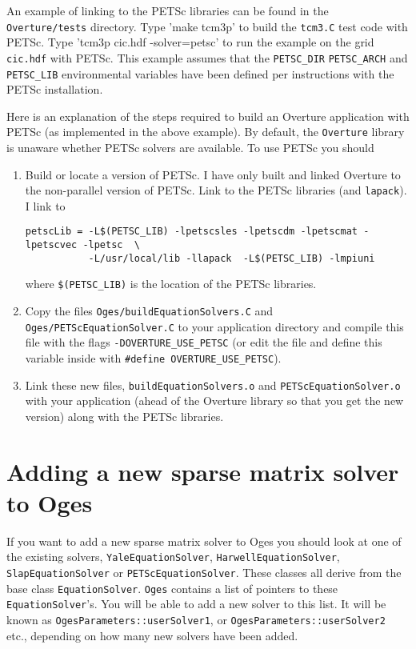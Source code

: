 \documentclass[11pt]{article}
\begin{document}
An example of linking to the PETSc libraries can be found in the {\tt Overture/tests}
directory. Type 'make tcm3p' to build the {\tt tcm3.C} test code with PETSc. Type
'tcm3p cic.hdf -solver=petsc' to run the example on the grid {\tt cic.hdf} with PETSc.
This example assumes that the {\tt PETSC\_DIR} {\tt PETSC\_ARCH} and {\tt PETSC\_LIB} environmental
variables have been defined per instructions with the PETSc installation.

Here is an explanation of the steps required to build an Overture application with PETSc
(as implemented in the above example).
By default, the {\tt Overture} library is unaware whether  PETSc solvers are available. 
To use PETSc you should
\begin{enumerate}
  \item Build or locate a version of PETSc. I have only built and linked Overture to
the non-parallel version of PETSc. Link to the PETSc libraries (and {\tt lapack}). I link to
\begin{verbatim}
petscLib = -L$(PETSC_LIB) -lpetscsles -lpetscdm -lpetscmat -lpetscvec -lpetsc  \
           -L/usr/local/lib -llapack  -L$(PETSC_LIB) -lmpiuni 
\end{verbatim}
where {\tt \$(PETSC\_LIB)} is the location of the PETSc libraries.
  \item Copy the files {\tt Oges/buildEquationSolvers.C} and {\tt Oges/PETScEquationSolver.C}
    to your application directory
    and compile this file with the flags {\tt -DOVERTURE\_USE\_PETSC} (or edit the file and
   define this variable inside with {\tt \#define OVERTURE\_USE\_PETSC}).
  \item Link these new files, {\tt buildEquationSolvers.o} and {\tt PETScEquationSolver.o}
      with your application (ahead of the
     Overture library so that you get the new version) along with the PETSc libraries.
\end{enumerate}

\section{Adding a new sparse matrix solver to Oges}

If you want to add a new sparse matrix solver to Oges you should look at one of the
existing solvers, {\tt YaleEquationSolver}, {\tt HarwellEquationSolver}, {\tt SlapEquationSolver}
or {\tt PETScEquationSolver}. These classes all derive from the base class {\tt EquationSolver}.
{\tt Oges} contains a list of pointers to these {\tt EquationSolver}'s. You will be able to add
a new solver to this list. It will be known as {\tt OgesParameters::userSolver1}, 
or {\tt OgesParameters::userSolver2} etc., depending on how many new solvers have been added.
\end{document}

